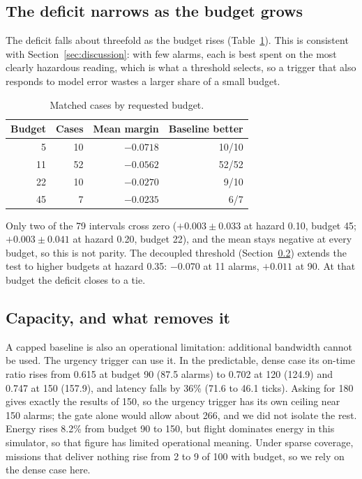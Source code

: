 \documentclass[pdflatex,sn-mathphys-num,iicol]{sn-jnl}
\theoremstyle{thmstyleone}
\theoremstyle{thmstyletwo}
\theoremstyle{thmstylethree}
\begin{document}
\subsection{The deficit narrows as the budget grows}\label{sec:narrowing}

The deficit falls about threefold as the budget rises (Table~\ref{tab:bybudget}). This is
consistent with Section~\ref{sec:discussion}: with few alarms, each is best spent on the most
clearly hazardous reading, which is what a threshold selects, so a trigger that also
responds to model error wastes a larger share of a small budget.

\begin{table}[t]
\caption{Matched cases by requested budget.}\label{tab:bybudget}
\centering
\footnotesize
\begin{tabular}{@{}rrrr@{}}
\toprule
\textbf{Budget} & \textbf{Cases} & \textbf{Mean margin} & \textbf{Baseline better} \\
\midrule
5  & 10 & $-0.0718$ & 10/10 \\
11 & 52 & $-0.0562$ & 52/52 \\
22 & 10 & $-0.0270$ & 9/10 \\
45 & 7  & $-0.0235$ & 6/7 \\
\bottomrule
\end{tabular}
\end{table}

Only two of the 79 intervals cross zero ($+0.003 \pm 0.033$ at hazard 0.10, budget 45;
$+0.003 \pm 0.041$ at hazard 0.20, budget 22), and the mean stays negative at every
budget, so this is not parity. The decoupled threshold (Section~\ref{sec:capacity})
extends the test to higher budgets at hazard 0.35: $-0.070$ at 11 alarms, $+0.011$ at 90.
At that budget the deficit closes to a tie.

\subsection{Capacity, and what removes it}\label{sec:capacity}

A capped baseline is also an operational limitation: additional bandwidth cannot be
used. The urgency trigger can use it. In the predictable, dense case its on-time ratio rises from
0.615 at budget 90 (87.5 alarms) to 0.702 at 120 (124.9) and 0.747 at 150 (157.9), and
latency falls by 36\% (71.6 to 46.1 ticks). Asking for 180 gives exactly the results of
150, so the urgency trigger has its own ceiling near 150 alarms; the gate alone would allow
about 266, and we did not isolate the rest. Energy rises 8.2\% from budget 90 to 150, but
flight dominates energy in this simulator, so that figure has limited operational meaning. Under sparse coverage, missions that deliver nothing rise from 2 to 9 of 100
with budget, so we rely on the dense case here.
\end{document}

